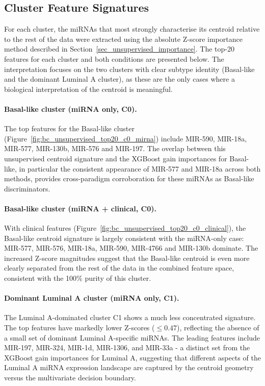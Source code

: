 \subsection{Cluster Feature Signatures}
\label{sec_expanded_unsupervised_importance}

For each cluster, the miRNAs that most strongly characterise its centroid relative to
the rest of the data were extracted using the absolute Z-score importance method
described in Section~\ref{sec_unsupervised_importance}. The top-20 features for each
cluster and both conditions are presented below. The interpretation focuses on the two
clusters with clear subtype identity (Basal-like and the dominant Luminal A cluster),
as these are the only cases where a biological interpretation of the centroid is
meaningful.

\paragraph{Basal-like cluster (miRNA only, C0).}
The top features for the Basal-like cluster (Figure~\ref{fig:bc_unsupervised_top20_c0_mirna}) 
include MIR-590, MIR-18a, MIR-577, MIR-130b, MIR-576 and MIR-197. 
The overlap between this unsupervised centroid signature
and the XGBoost gain importances for Basal-like, in particular the consistent
appearance of MIR-577 and MIR-18a across both methods, provides cross-paradigm
corroboration for these miRNAs as Basal-like discriminators.

\paragraph{Basal-like cluster (miRNA + clinical, C0).}
With clinical features (Figure~\ref{fig:bc_unsupervised_top20_c0_clinical}), the 
Basal-like centroid signature is largely consistent with
the miRNA-only case: MIR-577, MIR-576, MIR-18a, MIR-590, MIR-4766 and MIR-130b dominate. The increased Z-score magnitudes suggest that the Basal-like
centroid is even more clearly separated from the rest of the data in the combined
feature space, consistent with the 100\% purity of this cluster.

\paragraph{Dominant Luminal A cluster (miRNA only, C1).}
The Luminal A-dominated cluster C1 shows a much less concentrated signature. The
top features have markedly lower Z-scores ($\leq 0.47$), reflecting the absence of a
small set of dominant Luminal A-specific miRNAs. The leading features include
MIR-197, MIR-324, MIR-1d, MIR-1306, and MIR-33a - a distinct set from the XGBoost
gain importances for Luminal A, suggesting that different aspects of the Luminal A
miRNA expression landscape are captured by the centroid geometry versus the
multivariate decision boundary.

